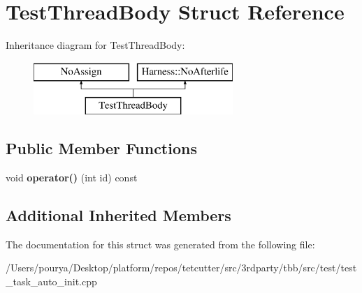 \hypertarget{structTestThreadBody}{}\section{Test\+Thread\+Body Struct Reference}
\label{structTestThreadBody}
Inheritance diagram for Test\+Thread\+Body\+:\begin{figure}[H]
\begin{center}
\leavevmode
\includegraphics[height=2.000000cm]{structTestThreadBody}
\end{center}
\end{figure}
\subsection*{Public Member Functions}
\begin{DoxyCompactItemize}
\item 
\hypertarget{structTestThreadBody_a679f2204f94b5f4fbb764398d724eaff}{}void {\bfseries operator()} (int id) const \label{structTestThreadBody_a679f2204f94b5f4fbb764398d724eaff}

\end{DoxyCompactItemize}
\subsection*{Additional Inherited Members}


The documentation for this struct was generated from the following file\+:\begin{DoxyCompactItemize}
\item 
/\+Users/pourya/\+Desktop/platform/repos/tetcutter/src/3rdparty/tbb/src/test/test\+\_\+task\+\_\+auto\+\_\+init.\+cpp\end{DoxyCompactItemize}
